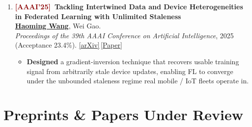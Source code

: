 \documentclass[11pt, letterpaper]{article}
\newenvironment{publist}{
  \begin{enumerate}[leftmargin=1.7em, itemsep=4pt, parsep=0pt, topsep=2pt, label=\arabic*.]
}{
  \end{enumerate}
}
\newcommand{\impactbullet}[1]{%
  \par\vspace{1pt}%
  \begin{itemize}[leftmargin=1.2em, topsep=0pt, itemsep=0pt, parsep=0pt, partopsep=0pt]
    \item #1
  \end{itemize}%
}
\newcommand{\me}{\underline{\textbf{Haoming Wang}}}
\begin{document}
\begin{publist}
\item \textbf{\textcolor{darkred}{[AAAI'25]}\ Tackling Intertwined Data and Device Heterogeneities in Federated Learning with Unlimited Staleness}\\
\me, Wei Gao.\\
\textit{Proceedings of the 39th AAAI Conference on Artificial Intelligence}, 2025 (Acceptance 23.4\%). \href{https://arxiv.org/abs/2309.13536}{[arXiv]}\,\href{https://haomingwang645.github.io/pdfs/aaai25_paper.pdf}{[Paper]}
\impactbullet{\textbf{Designed} a gradient-inversion technique that recovers usable training signal from arbitrarily stale device updates, enabling FL to converge under the unbounded staleness regime real mobile / IoT fleets operate in.}
\end{publist}

\section{Preprints \& Papers Under Review}
\end{document}
